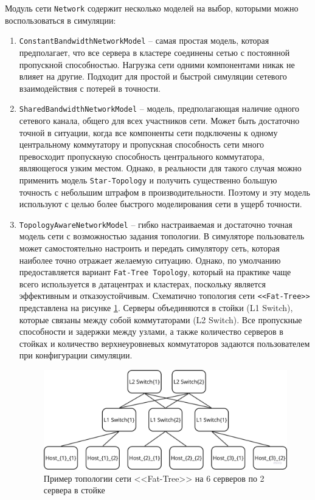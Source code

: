 Модуль сети \texttt{Network} содержит несколько моделей на выбор, которыми можно воспользоваться в симуляции:
\begin{enumerate}
    \item \texttt{ConstantBandwidthNetworkModel} -- самая простая модель, которая предполагает, что все сервера в кластере соединены сетью с постоянной пропускной способностью. Нагрузка сети одними компонентами никак не влияет на другие. Подходит для простой и быстрой симуляции сетевого взаимодействия с потерей в точности.
    \item \texttt{SharedBandwidthNetworkModel} -- модель, предполагающая наличие одного сетевого канала, общего для всех участников сети. Может быть достаточно точной в ситуации, когда все компоненты сети подключены к одному центральному коммутатору и пропускная способность сети много превосходит пропускную способность центрального коммутатора, являющегося узким местом. Однако, в реальности для такого случая можно применить модель \texttt{Star-Topology} и получить существенно большую точность с небольшим штрафом в производительности. Поэтому и эту модель используют с целью более быстрого моделирования сети в ущерб точности. 
    \item \texttt{TopologyAwareNetworkModel} -- гибко настраиваемая и достаточно точная модель сети с возможностью задания топологии. В симуляторе пользователь может самостоятельно настроить и передать симулятору сеть, которая наиболее точно отражает желаемую ситуацию. Однако, по умолчанию предоставляется вариант \texttt{Fat-Tree Topology}, который на практике чаще всего используется в датацентрах и кластерах, поскольку является эффективным и отказоустойчивым\cite{fat-tree-networks-article}.  Схематично топология сети \texttt{<<Fat-Tree>>} представлена на рисунке \ref{fig:fat_tree_topology}. Серверы объединяются в стойки (L1 Switch), которые связаны между собой коммутаторами (L2 Switch). Все пропускные способности и задержки между узлами, а также количество серверов в стойках и количество верхнеуровневых коммутаторов задаются пользователем при конфигурации симуляции.
    
    \begin{figure}[h!]
        \centering
        \includegraphics[width=0.8\linewidth]{images/fat_tree_topology}
        \caption{Пример топологии сети <<Fat-Tree>> на 6 серверов по 2 сервера в стойке}
        \label{fig:fat_tree_topology}
    \end{figure}
\end{enumerate}


